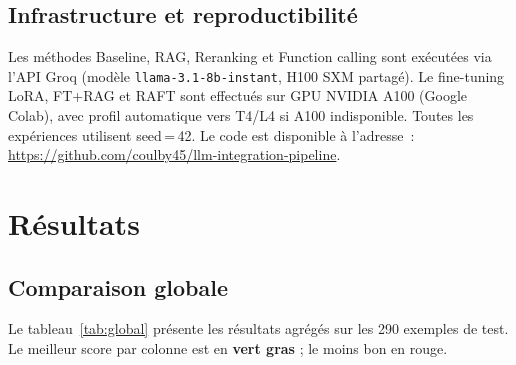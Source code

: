 \documentclass[10pt,journal,compsoc]{IEEEtran}
\begin{document}
\subsection{Infrastructure et reproductibilité}

Les méthodes Baseline, RAG, Reranking et Function calling sont exécutées
via l'API Groq (modèle \texttt{llama-3.1-8b-instant}, H100 SXM partagé).
Le fine-tuning LoRA, FT+RAG et RAFT sont effectués sur GPU NVIDIA A100
(Google Colab), avec profil automatique vers T4/L4 si A100 indisponible.
Toutes les expériences utilisent seed\,=\,42. Le code est disponible à
l'adresse~: \url{https://github.com/coulby45/llm-integration-pipeline}.


\section{Résultats}
\label{sec:results}

\subsection{Comparaison globale}
\label{subsec:global}

Le tableau~\ref{tab:global} présente les résultats agrégés sur les
290 exemples de test. Le meilleur score par colonne est en
\textbf{\textcolor{best}{vert gras}} ; le moins bon en
\textcolor{worst}{rouge}.
\end{document}

